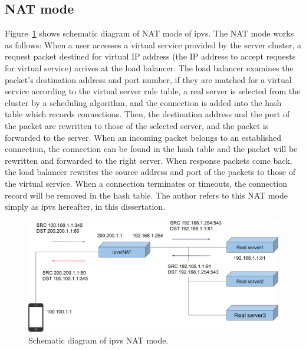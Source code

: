 \subsection{NAT mode}


Figure~\ref{fig:ipvs-nat-schem} shows schematic diagram of NAT mode of ipvs.
The NAT mode works as follows: When a user accesses a virtual service provided by the server cluster, a request packet destined for virtual IP address (the IP address to accept requests for virtual service) arrives at the load balancer.
The load balancer examines the packet's destination address and port number, if they are matched for a virtual service according to the virtual server rule table, a real server is selected from the cluster by a scheduling algorithm, and the connection is added into the hash table which records connections. 
Then, the destination address and the port of the packet are rewritten to those of the selected server, and the packet is forwarded to the
server. 
When an incoming packet belongs to an established connection, the connection can be found in the hash table and the packet will be rewritten and forwarded to the right server. 
When response packets come back, the load balancer rewrites the source address and port of the packets to those of the virtual service. When a connection terminates or timeouts, the connection record will be removed in the hash table.
%
The author refers to this NAT mode simply as ipvs hereafter, in this dissertation.


\begin{figure}[h]
  \centering
  \includegraphics[width=0.9\columnwidth]{Figs/ipvs-nat-schem}

  \par\bigskip
  \centering
  \begin{minipage}{0.9\columnwidth}
    \caption[ipvs NAT mode]{
      Schematic diagram of ipvs NAT mode.
    }
    \label{fig:ipvs-nat-schem}
  \end{minipage}
\end{figure}


